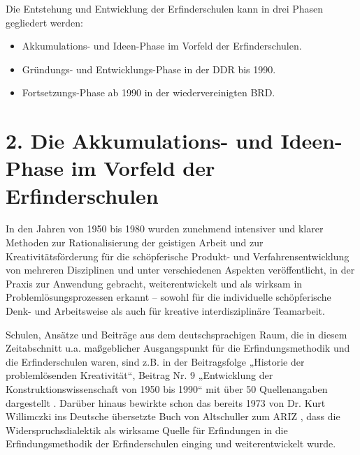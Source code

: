 \documentclass[11pt,a4paper]{article}
\begin{document}
Die Entstehung und Entwicklung der Erfinderschulen kann in drei Phasen
gegliedert werden:
\begin{itemize}
\item Akkumulations- und Ideen-Phase im Vorfeld der Erfinderschulen.
\item Gründungs- und Entwicklungs-Phase in der DDR bis 1990.
\item Fortsetzungs-Phase ab 1990 in der wiedervereinigten BRD.
\end{itemize}

\section*{2. Die Akkumulations- und Ideen-Phase im Vorfeld der
  Erfinderschulen} 
 
In den Jahren von 1950 bis 1980 wurden zunehmend intensiver und klarer
Methoden zur Rationalisierung der geistigen Arbeit und zur
Kreativitätsförderung für die schöpferische Produkt- und Verfahrensentwicklung
von mehreren Disziplinen und unter verschiedenen Aspekten ver\-öffent\-licht,
in der Praxis zur Anwendung gebracht, weiterentwickelt und als wirksam in
Problem\-lösungs\-prozessen erkannt -- sowohl für die individuelle
schöpferische Denk- und Arbeitsweise als auch für kreative interdisziplinäre
Teamarbeit.

Schulen, Ansätze und Beiträge aus dem deutschsprachigen Raum, die in diesem
Zeitabschnitt u.a. maßgeblicher Ausgangspunkt für die Erfindungsmethodik und
die Erfinderschulen waren, sind z.B. in der Beitragsfolge „Historie der
problemlösenden Kreativität“, Beitrag Nr. 9 „Entwicklung der
Konstruktionswissenschaft von 1950 bis 1990“ mit über 50 Quellenangaben
dargestellt \cite{1}. Darüber hinaus bewirkte schon das bereits 1973 von
Dr. Kurt Willimczki ins Deutsche übersetzte Buch von Altschuller zum ARIZ
\cite{3.1}, dass die Widerspruchsdialektik als wirksame Quelle für Erfindungen
in die Erfindungsmethodik der Erfinderschulen einging und weiterentwickelt
wurde.
\end{document}
